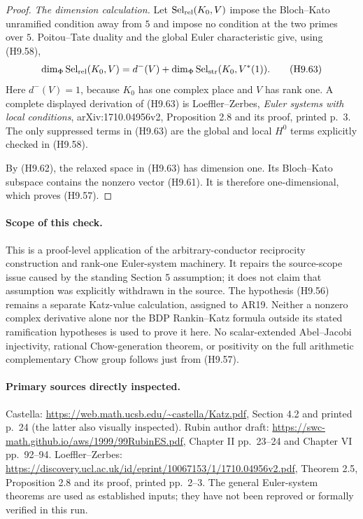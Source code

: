 \documentclass[11pt,a4paper]{article}
\begin{document}
\begin{proof}
\emph{The dimension calculation.}
Let $\operatorname{Sel}_{\rm rel}(K_0,V)$ impose the Bloch--Kato
unramified condition away from $5$ and impose no condition at the
two primes over $5$. Poitou--Tate duality and the global Euler
characteristic give, using (H9.58),
\[
 \dim_\Phi\operatorname{Sel}_{\rm rel}(K_0,V)
    =d^-(V)+
       \dim_\Phi\operatorname{Sel}_{\rm str}(K_0,V^*(1)).    \tag{H9.63}
\]
Here $d^-(V)=1$, because $K_0$ has one complex place and $V$ has
rank one. A complete displayed derivation of (H9.63) is
Loeffler--Zerbes, \emph{Euler systems with local conditions},
arXiv:1710.04956v2, Proposition 2.8 and its proof, printed p.~3.
The only suppressed terms in (H9.63) are the global and local
$H^0$ terms explicitly checked in (H9.58).

By (H9.62), the relaxed space in (H9.63) has dimension one.
Its Bloch--Kato subspace contains the nonzero vector (H9.61).
It is therefore one-dimensional, which proves (H9.57).
\end{proof}

\paragraph{Scope of this check.}
This is a proof-level application of the arbitrary-conductor
reciprocity construction and rank-one Euler-system machinery.
It repairs the source-scope issue caused by the standing
Section 5 assumption; it does not claim that assumption was
explicitly withdrawn in the source. The hypothesis (H9.56)
remains a separate Katz-value calculation, assigned to AR19.
Neither a nonzero complex derivative alone nor the BDP
Rankin--Katz formula outside its stated ramification hypotheses
is used to prove it here. No scalar-extended Abel--Jacobi
injectivity, rational Chow-generation theorem, or positivity on
the full arithmetic complementary Chow group follows just from
(H9.57).

\paragraph{Primary sources directly inspected.}
Castella: \url{https://web.math.ucsb.edu/~castella/Katz.pdf},
Section 4.2 and printed p.~24 (the latter also visually inspected).
Rubin author draft:
\url{https://swc-math.github.io/aws/1999/99RubinES.pdf},
Chapter II pp.~23--24 and Chapter VI pp.~92--94.
Loeffler--Zerbes:
\url{https://discovery.ucl.ac.uk/id/eprint/10067153/1/1710.04956v2.pdf},
Theorem 2.5, Proposition 2.8 and its proof, printed pp.~2--3.
The general Euler-system theorems are used as established inputs;
they have not been reproved or formally verified in this run.
\end{document}
